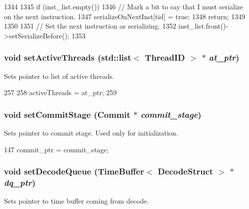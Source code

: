 \begin{DoxyCode}
1344 {
1345     if (inst_list.empty()) {
1346         // Mark a bit to say that I must serialize on the next instruction.
1347         serializeOnNextInst[tid] = true;
1348         return;
1349     }
1350 
1351     // Set the next instruction as serializing.
1352     inst_list.front()->setSerializeBefore();
1353 }
\end{DoxyCode}
\hypertarget{classDefaultRename_aab96bdacf8bd420402cbb543f994e054}{
\subsubsection[{setActiveThreads}]{\setlength{\rightskip}{0pt plus 5cm}void setActiveThreads ({\bf std::list}$<$ {\bf ThreadID} $>$ $\ast$ {\em at\_\-ptr})}}
\label{classDefaultRename_aab96bdacf8bd420402cbb543f994e054}
Sets pointer to list of active threads. 


\begin{DoxyCode}
257 {
258     activeThreads = at_ptr;
259 }
\end{DoxyCode}
\hypertarget{classDefaultRename_a1e488bc36055daaf1f86a9b4e58118c2}{
\subsubsection[{setCommitStage}]{\setlength{\rightskip}{0pt plus 5cm}void setCommitStage ({\bf Commit} $\ast$ {\em commit\_\-stage})}}
\label{classDefaultRename_a1e488bc36055daaf1f86a9b4e58118c2}
Sets pointer to commit stage. Used only for initialization. 


\begin{DoxyCode}
147     { commit_ptr = commit_stage; }
\end{DoxyCode}
\hypertarget{classDefaultRename_a21f95db13a2fc05d7a5fcc43fec1f1e7}{
\subsubsection[{setDecodeQueue}]{\setlength{\rightskip}{0pt plus 5cm}void setDecodeQueue ({\bf TimeBuffer}$<$ {\bf DecodeStruct} $>$ $\ast$ {\em dq\_\-ptr})}}
\label{classDefaultRename_a21f95db13a2fc05d7a5fcc43fec1f1e7}
Sets pointer to time buffer coming from decode. 


